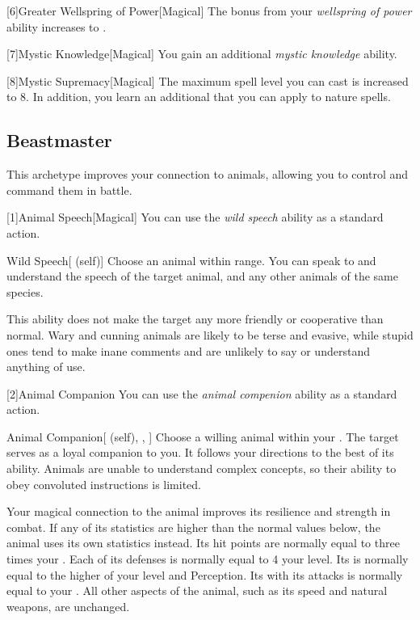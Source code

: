         [6]{Greater Wellspring of Power}[Magical]
        The bonus from your \textit{wellspring of power} ability increases to .

        [7]{Mystic Knowledge}[Magical]
        You gain an additional \textit{mystic knowledge} ability.

        [8]{Mystic Supremacy}[Magical]
        The maximum spell level you can cast is increased to 8.
        In addition, you learn an additional  that you can apply to nature spells.

    \subsection{Beastmaster}
        This archetype improves your connection to animals, allowing you to control and command them in battle.

        [1]{Animal Speech}[Magical] You can use the \textit{wild speech} ability as a standard action.
        \begin{attuneability}{Wild Speech}[ (self)]
            Choose an animal within \rnglong range.
            You can speak to and understand the speech of the target animal, and any other animals of the same species.

            This ability does not make the target any more friendly or cooperative than normal.
            Wary and cunning animals are likely to be terse and evasive, while stupid ones tend to make inane comments and are unlikely to say or understand anything of use.
        \end{attuneability}

        [2]{Animal Companion}
        You can use the \textit{animal compenion} ability as a standard action.
        \begin{attuneability}{Animal Companion}[ (self), , ]
            Choose a willing animal within your .
            The target serves as a loyal companion to you.
            It follows your directions to the best of its ability.
            Animals are unable to understand complex concepts, so their ability to obey convoluted instructions is limited.

            Your magical connection to the animal improves its resilience and strength in combat.
            If any of its statistics are higher than the normal values below, the animal uses its own statistics instead.
            Its hit points are normally equal to three times your .
            Each of its defenses is normally equal to 4 \add your level.
            Its  is normally equal to the higher of your level and Perception.
            Its  with its attacks is normally equal to your .
            All other aspects of the animal, such as its speed and natural weapons, are unchanged.
        \end{attuneability}

